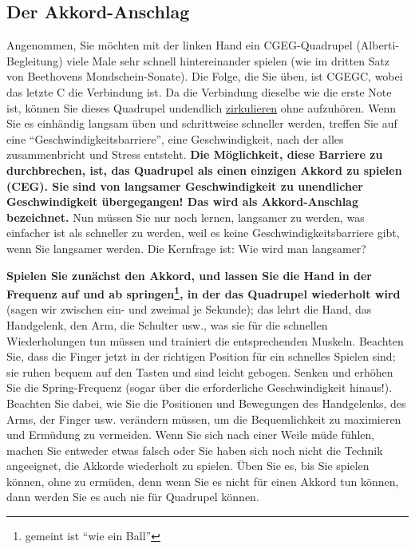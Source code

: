 \subsection{Der Akkord-Anschlag}
\label{c1ii9}

Angenommen, Sie möchten mit der linken Hand ein CGEG-Quadrupel (Alberti-Begleitung) viele Male sehr schnell hintereinander spielen (wie im dritten Satz von Beethovens Mondschein-Sonate).
Die Folge, die Sie üben, ist CGEGC, wobei das letzte C die Verbindung ist.
Da die Verbindung dieselbe wie die erste Note ist, können Sie dieses Quadrupel undendlich \hyperref[c1iii2]{zirkulieren} ohne aufzuhören.
Wenn Sie es einhändig langsam üben und schrittweise schneller werden, treffen Sie auf eine \enquote{Geschwindigkeitsbarriere}, eine Geschwindigkeit, nach der alles zusammenbricht und Stress entsteht.
\textbf{Die Möglichkeit, diese Barriere zu durchbrechen, ist, das Quadrupel als einen einzigen Akkord zu spielen (CEG).
Sie sind von langsamer Geschwindigkeit zu unendlicher Geschwindigkeit übergegangen!
Das wird als Akkord-Anschlag bezeichnet.}
Nun müssen Sie nur noch lernen, langsamer zu werden, was einfacher ist als schneller zu werden, weil es keine Geschwindigkeitsbarriere gibt, wenn Sie langsamer werden.
Die Kernfrage ist: Wie wird man langsamer?

\textbf{Spielen Sie zunächst den Akkord, und lassen Sie die Hand in der Frequenz auf und ab springen\footnote{gemeint ist \enquote{wie ein Ball}}, in der das Quadrupel wiederholt wird} (sagen wir zwischen ein- und zweimal je Sekunde); das lehrt die Hand, das Handgelenk, den Arm, die Schulter usw., was sie für die schnellen Wiederholungen tun müssen und trainiert die entsprechenden Muskeln.
Beachten Sie, dass die Finger jetzt in der richtigen Position für ein schnelles Spielen sind; sie ruhen bequem auf den Tasten und sind leicht gebogen.
Senken und erhöhen Sie die Spring-Frequenz (sogar über die erforderliche Geschwindigkeit hinaus!).
Beachten Sie dabei, wie Sie die Positionen und Bewegungen des Handgelenks, des Arms, der Finger usw. verändern müssen, um die Bequemlichkeit zu maximieren und Ermüdung zu vermeiden.
Wenn Sie sich nach einer Weile müde fühlen, machen Sie entweder etwas falsch oder Sie haben sich noch nicht die Technik angeeignet, die Akkorde wiederholt zu spielen.
Üben Sie es, bis Sie spielen können, ohne zu ermüden, denn wenn Sie es nicht für einen Akkord tun können, dann werden Sie es auch nie für Quadrupel können.

